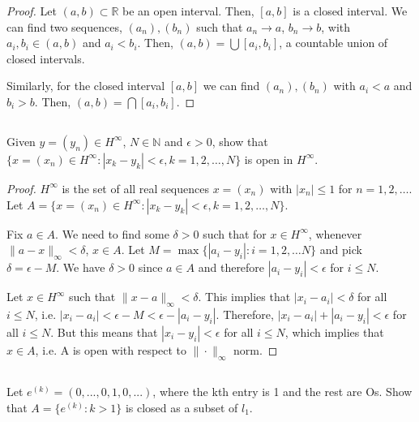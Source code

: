 \begin{proof}
Let $(a,b) \subset \mathbb{R}$ be an open interval. Then, $[a,b]$ is a closed interval. We can find two sequences, $(a_n), (b_n)$ such that $a_n \rightarrow a$, $b_n \rightarrow b$, with $a_i, b_i \in (a,b)$ and $a_i < b_i$. Then, $(a,b) = \bigcup [a_i, b_i]$, a countable union of closed intervals.

Similarly, for the closed interval $[a,b]$ we can find $(a_n), (b_n)$ with $a_i < a$ and $b_i > b$. Then, $(a,b) = \bigcap [a_i, b_i]$.
\end{proof}


\subsection{} Given $y=(y_n) \in H^\infty$, $N \in \mathbb{N}$ and $\epsilon > 0$, show that $\{x = (x_n) \in H^\infty : |x_k - y_k| < \epsilon, k=1,2,\dots,N\}$ is open in $H^\infty$.

\begin{proof}
$H^\infty$ is the set of all real sequences $x=(x_n)$ with $|x_n| \leq 1$ for $n=1,2,\dots$. Let $A = \{x = (x_n) \in H^\infty : |x_k - y_k| < \epsilon, k=1,2,\dots,N\}$.

Fix $a \in A$. We need to find some $\delta > 0$ such that for $x \in H^\infty$, whenever $\|a - x\|_\infty < \delta$, $x \in A$. Let $M = \max\{|a_i - y_i|: i = 1, 2, \dots N\}$ and pick $\delta = \epsilon - M$. We have $\delta > 0$ since $a \in A$ and therefore $|a_i - y_i| < \epsilon$ for $i \leq N$. 

Let $x \in H^\infty$ such that $\|x-a\|_\infty < \delta$. This implies that $|x_i - a_i| < \delta$ for all $i \leq N$, i.e. $|x_i - a_i| < \epsilon - M < \epsilon - |a_i - y_i|$. Therefore,  $|x_i - a_i| + |a_i - y_i| < \epsilon$ for all $i \leq N$. But this means that $|x_i - y_i| < \epsilon$ for all $i \leq N$, which implies that $x \in A$, i.e. A is open with respect to $\|\cdot \|_\infty$ norm.

\end{proof}

\subsection{} Let $e^{(k)} = (0, ... ,  0, 1, 0, ... )$, where  the kth entry is 1 and the rest are Os. Show that $A = \{ e^{(k)} : k > 1 \}$  is closed as a subset of $l_1$.

